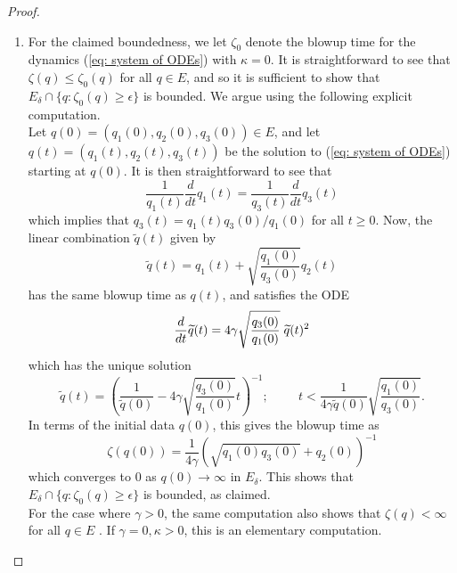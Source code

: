 \begin{proof} \begin{enumerate}[label=\roman{*}).]
    \item For the claimed boundedness, we let $\zeta_0$ denote the blowup time for the dynamics (\ref{eq: system of ODEs}) with $\kappa=0$. It is straightforward to see that $\zeta(q)\le\zeta_0(q)$ for all $q\in E$, and so it is sufficient to show that $E_\delta\cap \{q: \zeta_0(q)\ge \epsilon\}$ is bounded. We argue using the following explicit computation. \medskip \\ Let $q(0)=(q_1(0),q_2(0),q_3(0))\in E$, and let $q(t)=(q_1(t),q_2(t),q_3(t))$ be the solution to (\ref{eq: system of ODEs}) starting at $q(0)$. It is then straightforward to see that \begin{equation}
        \frac{1}{q_1(t)}\frac{d}{dt}q_1(t)=\frac{1}{q_3(t)}\frac{d}{dt}q_3(t)
    \end{equation} which implies that $q_3(t)=q_1(t)q_3(0)/q_1(0)$ for all $t\ge 0$. Now, the linear combination $\widetilde{q}(t)$ given by \begin{equation}
        \widetilde{q}(t)=q_1(t)+\sqrt{\frac{q_1(0)}{q_3(0)}}q_2(t)
    \end{equation} has the same blowup time as $q(t)$, and satisfies the ODE \begin{equation} \frac{d}{dt}\widetilde{q}(t)=4\gamma\sqrt{\frac{q_3(0)}{q_1(0)}}\hspace{0.1cm}\widetilde{q}(t)^2 \end{equation} which has the unique solution \begin{equation} \widetilde{q}(t)=\left(\frac{1}{\widetilde{q}(0)}-4\gamma\sqrt{\frac{q_3(0)}{q_1(0)}}t\right)^{-1}; \hspace{1cm} t< \frac{1}{4\gamma\widetilde{q}(0)}\sqrt{\frac{q_1(0)}{q_3(0)}}. \end{equation} In terms of the initial data $q(0)$, this gives the blowup time as \begin{equation} \zeta(q(0))=\frac{1}{4\gamma}\left(\sqrt{q_1(0)q_3(0)}+q_2(0)\right)^{-1} \end{equation} which converges to $0$ as $q(0)\rightarrow \infty$ in $E_\delta.$ This shows that $E_\delta \cap \{q: \zeta_0(q)\ge \epsilon\}$ is bounded, as claimed. \medskip \\ For the case where $\gamma>0$, the same computation also shows that $\zeta(q)<\infty$ for all $q\in E$ . If $\gamma=0, \kappa>0$, this is an elementary computation.

\end{enumerate}
\end{proof}
